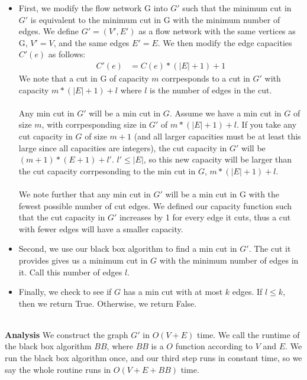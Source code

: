 \documentclass[11pt]{article}
\begin{document}
\begin{enumerate}[(a)]
\begin{solution}
\begin{itemize} 
\item First, we modify the flow network G into $G'$ such that the minimum cut in $G'$ is equivalent to the minimum cut in G with the minimum number of edges. We define $G'=(V', E')$ as a flow network with the same vertices as G, $V'=V$, and the same edges $E'=E$. We then modify the edge capacities $C'(e)$ as follows: 
\begin{align*}
C'(e) &= C(e)*(|E|+1) + 1  
\end{align*}
We note that a cut in G of capacity $m$ corrpesponds to a cut in $G'$ with capacity $m*(|E|+1)+l$ where $l$ is the number of edges in the cut. \\ \\
Any min cut in $G'$ will be a min cut in $G$. Assume we have a min cut in $G$ of size $m$, with corrpesponding size in $G'$ of $m*(|E|+1)+l$. If you take any cut capacity in $G$ of size $m+1$ (and all larger capacities must be at least this large since all capacities are integers), the cut capacity in $G'$ will be $(m+1)*(E+1)+l'$. $l'\leq |E|$, so this new capacity will be larger than the cut capacity corrpesonding to the min cut in $G$, $m*(|E|+1)+l$. \\ \\
We note further that any min cut in $G'$ will be a min cut in G with the fewest possible number of cut edges. We defined our capacity function such that the cut capacity in $G'$ increases by 1 for every edge it cuts, thus a cut with fewer edges will have a smaller capacity. \\

\item Second, we use our black box algorithm to find a min cut in $G'$. The cut it provides gives us a minimum cut in $G$ with the minimum number of edges in it. Call this number of edges $l$. \\

\item Finally, we check to see if $G$ has a min cut with at most $k$ edges. If $l\leq k$, then we return True. Otherwise, we return False.

\end{itemize}
\\
\textbf{Analysis} We construct the graph $G'$ in $O(V+E)$ time. We call the runtime of the black box algorithm $BB$, where $BB$ is a $O$ function according to $V$ and $E$. We run the black box algorithm once, and our third step runs in constant time, so we say the whole routine runs in $O(V+E+BB)$ time.

\end{solution}
\end{enumerate}
\end{document}
